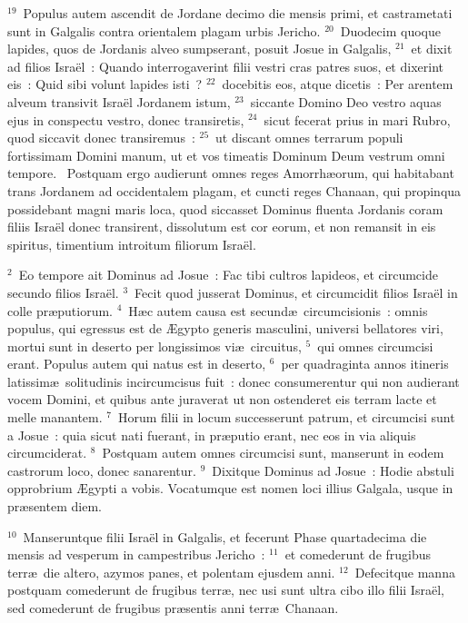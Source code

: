 ${}^{19}$~Populus autem ascendit de Jordane decimo die mensis primi, et castrametati sunt in Galgalis contra orientalem plagam urbis Jericho.
${}^{20}$~Duodecim quoque lapides, quos de Jordanis alveo sumpserant, posuit Josue in Galgalis,
${}^{21}$~et dixit ad filios Isra\"el~: Quando interrogaverint filii vestri cras patres suos, et dixerint eis~: Quid sibi volunt lapides isti~?
${}^{22}$~docebitis eos, atque dicetis~: Per arentem alveum transivit Isra\"el Jordanem istum,
${}^{23}$~siccante Domino Deo vestro aquas ejus in conspectu vestro, donec transiretis,
${}^{24}$~sicut fecerat prius in mari Rubro, quod siccavit donec transiremus~:
${}^{25}$~ut discant omnes terrarum populi fortissimam Domini manum, ut et vos timeatis Dominum Deum vestrum omni tempore.
~\lettrine[lines=10,image=true,loversize=0.05,lraise=-0.03]{P}{}ostquam ergo audierunt omnes reges Amorrh\ae orum, qui habitabant trans Jordanem ad occidentalem plagam, et cuncti reges Chanaan, qui propinqua possidebant magni maris loca, quod siccasset Dominus fluenta Jordanis coram filiis Isra\"el donec transirent, dissolutum est cor eorum, et non remansit in eis spiritus, timentium introitum filiorum Isra\"el.


${}^{2}$~Eo tempore ait Dominus ad Josue~: Fac tibi cultros lapideos, et circumcide secundo filios Isra\"el.
${}^{3}$~Fecit quod jusserat Dominus, et circumcidit filios Isra\"el in colle pr\ae putiorum.
${}^{4}$~H\ae c autem causa est secund\ae\ circumcisionis~: omnis populus, qui egressus est de \AE gypto generis masculini, universi bellatores viri, mortui sunt in deserto per longissimos vi\ae\ circuitus,
${}^{5}$~qui omnes circumcisi erant. Populus autem qui natus est in deserto,
${}^{6}$~per quadraginta annos itineris latissim\ae\ solitudinis incircumcisus fuit~: donec consumerentur qui non audierant vocem Domini, et quibus ante juraverat ut non ostenderet eis terram lacte et melle manantem.
${}^{7}$~Horum filii in locum successerunt patrum, et circumcisi sunt a Josue~: quia sicut nati fuerant, in pr\ae putio erant, nec eos in via aliquis circumciderat.
${}^{8}$~Postquam autem omnes circumcisi sunt, manserunt in eodem castrorum loco, donec sanarentur.
${}^{9}$~Dixitque Dominus ad Josue~: Hodie abstuli opprobrium \AE gypti a vobis. Vocatumque est nomen loci illius Galgala, usque in pr\ae sentem diem.


${}^{10}$~Manseruntque filii Isra\"el in Galgalis, et fecerunt Phase quartadecima die mensis ad vesperum in campestribus Jericho~:
${}^{11}$~et comederunt de frugibus terr\ae\ die altero, azymos panes, et polentam ejusdem anni.
${}^{12}$~Defecitque manna postquam comederunt de frugibus terr\ae , nec usi sunt ultra cibo illo filii Isra\"el, sed comederunt de frugibus pr\ae sentis anni terr\ae\ Chanaan.


